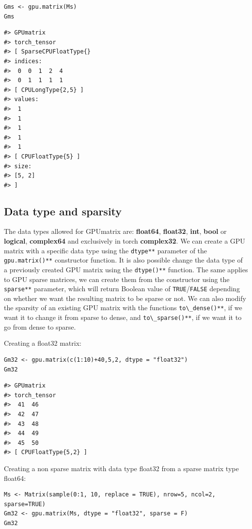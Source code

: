 \begin{verbatim}
Gms <- gpu.matrix(Ms)
Gms
\end{verbatim}

\begin{verbatim}
#> GPUmatrix
#> torch_tensor
#> [ SparseCPUFloatType{}
#> indices:
#>  0  0  1  2  4
#>  0  1  1  1  1
#> [ CPULongType{2,5} ]
#> values:
#>  1
#>  1
#>  1
#>  1
#>  1
#> [ CPUFloatType{5} ]
#> size:
#> [5, 2]
#> ]
\end{verbatim}

\hypertarget{data-type-and-sparsity}{%
\subsection{Data type and sparsity}\label{data-type-and-sparsity}}

The data types allowed for GPUmatrix are: \textbf{float64}, \textbf{float32}, \textbf{int}, \textbf{bool} or \textbf{logical}, \textbf{complex64} and exclusively in torch \textbf{complex32}. We can create a GPU matrix with a specific data type using the \texttt{dtype**} parameter of the \texttt{gpu.matrix()**} constructor function. It is also possible change the data type of a previously created GPU matrix using the \texttt{dtype()**} function. The same applies to GPU sparse matrices, we can create them from the constructor using the \texttt{sparse**} parameter, which will return Boolean value of \texttt{TRUE}/\texttt{FALSE} depending on whether we want the resulting matrix to be sparse or not. We can also modify the sparsity of an existing GPU matrix with the functions \texttt{to\textbackslash{}\_dense()**}, if we want it to change it from sparse to dense, and \texttt{to\textbackslash{}\_sparse()**}, if we want it to go from dense to sparse.

Creating a float32 matrix:

\begin{verbatim}
Gm32 <- gpu.matrix(c(1:10)+40,5,2, dtype = "float32")
Gm32
\end{verbatim}

\begin{verbatim}
#> GPUmatrix
#> torch_tensor
#>  41  46
#>  42  47
#>  43  48
#>  44  49
#>  45  50
#> [ CPUFloatType{5,2} ]
\end{verbatim}

Creating a non sparse matrix with data type float32 from a sparse matrix type float64:

\begin{verbatim}
Ms <- Matrix(sample(0:1, 10, replace = TRUE), nrow=5, ncol=2, sparse=TRUE)
Gm32 <- gpu.matrix(Ms, dtype = "float32", sparse = F)
Gm32
\end{verbatim}

